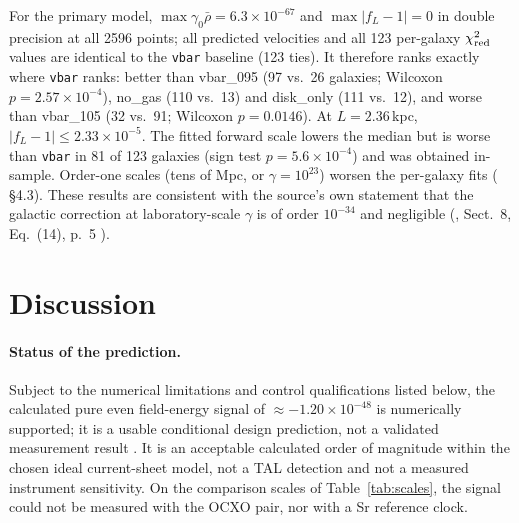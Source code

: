 \documentclass[12pt,a4paper]{article}
\begin{document}
For the primary model, $\max\gamma_0\bar\rho=6.3\times10^{-67}$ and $\max|f_L-1|=0$ in double precision at all
2596 points; all predicted velocities and all 123 per-galaxy $\chi^2_{\rm red}$ values are identical to the
\texttt{vbar} baseline (123 ties). It therefore ranks exactly where \texttt{vbar} ranks: better than vbar\_095
(97 vs.\ 26 galaxies; Wilcoxon $p=2.57\times10^{-4}$), no\_gas (110 vs.\ 13) and disk\_only (111 vs.\ 12), and
worse than vbar\_105 (32 vs.\ 91; Wilcoxon $p=0.0146$). At $L=2.36$\,kpc, $|f_L-1|\le2.33\times10^{-5}$. The
fitted forward scale lowers the median but is worse than \texttt{vbar} in 81 of 123 galaxies (sign test
$p=5.6\times10^{-4}$) and was obtained in-sample. Order-one scales (tens of Mpc, or $\gamma=10^{23}$) worsen the
per-galaxy fits ( \S4.3). These results are consistent with the source's own statement
that the galactic correction at laboratory-scale $\gamma$ is of order $10^{-34}$ and negligible
(, Sect.~8, Eq.~(14), p.~5 \cite{TAL_formalism}).

\section{Discussion}\label{sec:discussion}

\paragraph{Status of the prediction.}
Subject to the numerical limitations and control qualifications listed below, the calculated pure even field-energy
signal of $\approx-1.20\times10^{-48}$ is numerically supported; it is a usable conditional design prediction, not a
validated measurement result \cite{TAL_V20}. It is an acceptable calculated order of magnitude within the chosen
ideal current-sheet model, not a TAL detection and not a measured instrument sensitivity. On the comparison scales
of Table~\ref{tab:scales}, the signal could not be measured with the OCXO pair, nor with a Sr reference clock.
\end{document}
